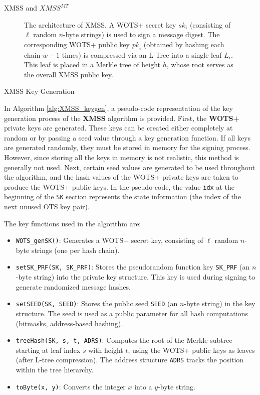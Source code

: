 \documentclass[version=preprint]{iacrcc}
\begin{document}
\begin{section}{XMSS and \texorpdfstring{$XMSS^{MT}$}{XMSS MT}}
\begin{figure}[h]
\caption{The architecture of XMSS. A WOTS+ secret key $\mathit{sk}_i$ (consisting of $\ell$ random $n$-byte strings) is used to sign a message digest. The corresponding WOTS+ public key $\mathit{pk}_i$ (obtained by hashing each chain $w{-}1$ times) is compressed via an L-Tree into a single leaf $L_i$. This leaf is placed in a Merkle tree of height $h$, whose root serves as the overall XMSS public key.}
\label{fig:xmss}
\end{figure}


    \begin{subsection}{XMSS Key Generation}

        In Algorithm \ref{alg:XMSS_keygen}, a pseudo-code representation of the key generation process of the \textbf{XMSS} algorithm is provided. First, the \textbf{WOTS+} private keys are generated. These keys can be created either completely at random or by passing a seed value through a key generation function. If all keys are generated randomly, they must be stored in memory for the signing process. However, since storing all the keys in memory is not realistic, this method is generally not used. Next, certain seed values are generated to be used throughout the algorithm, and the hash values of the WOTS+ private keys are taken to produce the WOTS+ public keys. In the pseudo-code, the value \texttt{idx} at the beginning of the \texttt{SK} section represents the state information (the index of the next unused OTS key pair).

        The key functions used in the algorithm are:
        \begin{itemize}
            \item \texttt{WOTS\_genSK()}: Generates a WOTS+ secret key, consisting of $\ell$ random $n$-byte strings (one per hash chain).
            \item \texttt{setSK\_PRF(SK, SK\_PRF)}: Stores the pseudorandom function key \texttt{SK\_PRF} (an $n$-byte string) into the private key structure. This key is used during signing to generate randomized message hashes.
            \item \texttt{setSEED(SK, SEED)}: Stores the public seed \texttt{SEED} (an $n$-byte string) in the key structure. The seed is used as a public parameter for all hash computations (bitmasks, address-based hashing).
            \item \texttt{treeHash(SK, s, t, ADRS)}: Computes the root of the Merkle subtree starting at leaf index $s$ with height $t$, using the WOTS+ public keys as leaves (after L-tree compression). The address structure \texttt{ADRS} tracks the position within the tree hierarchy.
            \item \texttt{toByte(x, y)}: Converts the integer $x$ into a $y$-byte string.
        \end{itemize}


\end{subsection}
\end{section}
\end{document}
